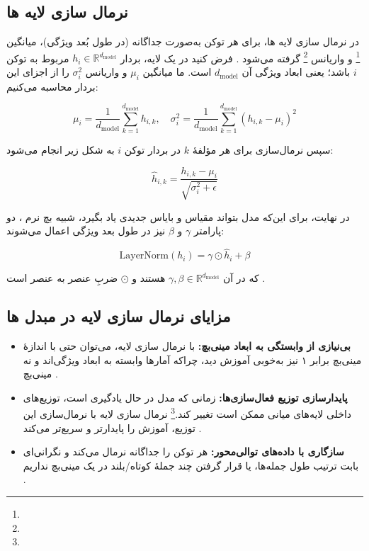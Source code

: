 \subsection*{نرمال سازی لایه ها}
در  نرمال سازی لایه ها، برای هر توکن به‌صورت جداگانه (در طول بُعد ویژگی)، میانگین \footnote{} و واریانس \footnote{} گرفته می‌شود \cite{ba2016layer}.
فرض کنید در یک لایه، بردار \( h_i \in \mathbb{R}^{d_{\text{model}}} \) مربوط به توکن \( i \) باشد؛ یعنی ابعاد ویژگی آن \( d_{\text{model}} \) است. ما میانگین \( \mu_i \) و واریانس \( \sigma_i^2 \) را از اجزای این بردار محاسبه می‌کنیم:

\begin{equation}
	\mu_i = \frac{1}{d_{\text{model}}} \sum_{k=1}^{d_{\text{model}}} h_{i,k}, \quad
	\sigma_i^2 = \frac{1}{d_{\text{model}}} \sum_{k=1}^{d_{\text{model}}} (h_{i,k} - \mu_i)^2
	\label{eq:mean_variance}
\end{equation}


سپس نرمال‌سازی برای هر مؤلفهٔ \( k \) در بردار توکن \( i \) به شکل زیر انجام می‌شود:

\begin{equation}
	\hat{h}_{i,k} = \frac{h_{i,k} - \mu_i}{\sqrt{\sigma_i^2 + \epsilon}}
	\label{eq:normalized_h}
\end{equation}

در نهایت، برای این‌که مدل بتواند مقیاس و بایاس جدیدی یاد بگیرد، شبیه بچ نرم ، دو پارامتر \( \gamma \) و \( \beta \) نیز در طول بعد ویژگی اعمال می‌شوند:

\begin{equation}
	\text{LayerNorm}(h_i) = \gamma \odot \hat{h}_i + \beta
	\label{eq:layernorm}
\end{equation}


که در آن \( \gamma, \beta \in \mathbb{R}^{d_{\text{model}}} \) هستند و \( \odot \) ضربِ عنصر به عنصر است \cite{ba2016layer}.

\subsection*{مزایای نرمال سازی لایه در مبدل ها}

\begin{itemize}
	\item \textbf{بی‌نیازی از وابستگی به ابعاد مینی‌بچ:}  
	با نرمال سازی لایه، می‌توان حتی با اندازهٔ مینی‌بچ برابر ۱ نیز به‌خوبی آموزش دید، چراکه آمارها وابسته به ابعاد ویژگی‌اند و نه مینی‌بچ \cite{ba2016layer}.
	
	\item \textbf{پایدارسازی توزیع فعال‌سازی‌ها:}  
	زمانی که مدل در حال یادگیری است، توزیع‌های داخلی لایه‌های میانی ممکن است تغییر کند.\footnote{} نرمال سازی لایه با نرمال‌سازی این توزیع، آموزش را پایدارتر و سریع‌تر می‌کند \cite{ioffe2015batch,ba2016layer}.
	
	\item \textbf{سازگاری با داده‌های توالی‌محور:}  
	هر توکن را جداگانه نرمال می‌کند و نگرانی‌ای بابت ترتیب طول جمله‌ها، یا قرار گرفتن چند جملهٔ کوتاه/بلند در یک مینی‌بچ نداریم \cite{vaswani2017attention}.
\end{itemize}

